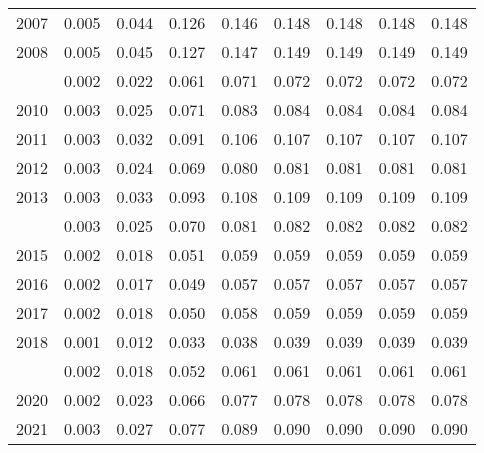 \documentclass[
]{article}
\begin{document}
\begin{longtable}[t]{lrrrrrrrr}
2007 & 0.005 & 0.044 & 0.126 & 0.146 & 0.148 & 0.148 & 0.148 & 0.148\\
2008 & 0.005 & 0.045 & 0.127 & 0.147 & 0.149 & 0.149 & 0.149 & 0.149\\
\addlinespace
2009 & 0.002 & 0.022 & 0.061 & 0.071 & 0.072 & 0.072 & 0.072 & 0.072\\
2010 & 0.003 & 0.025 & 0.071 & 0.083 & 0.084 & 0.084 & 0.084 & 0.084\\
2011 & 0.003 & 0.032 & 0.091 & 0.106 & 0.107 & 0.107 & 0.107 & 0.107\\
2012 & 0.003 & 0.024 & 0.069 & 0.080 & 0.081 & 0.081 & 0.081 & 0.081\\
2013 & 0.003 & 0.033 & 0.093 & 0.108 & 0.109 & 0.109 & 0.109 & 0.109\\
\addlinespace
2014 & 0.003 & 0.025 & 0.070 & 0.081 & 0.082 & 0.082 & 0.082 & 0.082\\
2015 & 0.002 & 0.018 & 0.051 & 0.059 & 0.059 & 0.059 & 0.059 & 0.059\\
2016 & 0.002 & 0.017 & 0.049 & 0.057 & 0.057 & 0.057 & 0.057 & 0.057\\
2017 & 0.002 & 0.018 & 0.050 & 0.058 & 0.059 & 0.059 & 0.059 & 0.059\\
2018 & 0.001 & 0.012 & 0.033 & 0.038 & 0.039 & 0.039 & 0.039 & 0.039\\
\addlinespace
2019 & 0.002 & 0.018 & 0.052 & 0.061 & 0.061 & 0.061 & 0.061 & 0.061\\
2020 & 0.002 & 0.023 & 0.066 & 0.077 & 0.078 & 0.078 & 0.078 & 0.078\\
2021 & 0.003 & 0.027 & 0.077 & 0.089 & 0.090 & 0.090 & 0.090 & 0.090\\*
\end{longtable}
\end{document}
